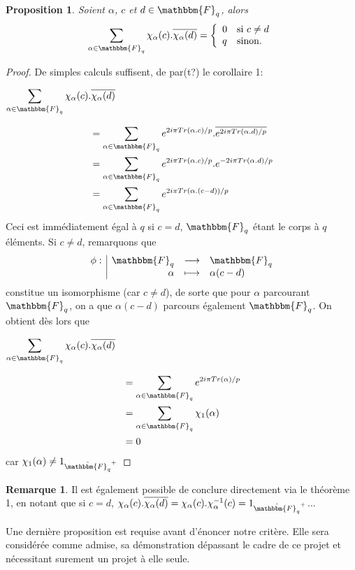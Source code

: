 \documentclass[12pt]{article}
\newcommand{\Fq}{\mathbbm{F}_q}
\newcommand{\fonction}[5]{
\begin{displaymath}
\begin{array}{l|rcl}
\displaystyle
#1 : & #2 & \longrightarrow & #3 \\
    & #4 & \longmapsto & #5
\end{array}
\end{displaymath}
}
\newtheorem{prop}{Proposition}
\theoremstyle{definition}\newtheorem{defn}{Définition}
\theoremstyle{definition}\newtheorem{exm}{Exemple}
\theoremstyle{definition}\newtheorem{rem}{Remarque}
\theoremstyle{definition}\newtheorem{algo}{Algorithme}
\theoremstyle{remark}\newtheorem{exo}{Exercice}
\theoremstyle{remark}\newtheorem{note}{Note}
\theoremstyle{remark}\newtheorem{nota}{Notation}
\begin{document}
\begin{prop}
Soient $\alpha$, $c$ et $d \in \Fq$, alors
$$
\displaystyle\sum_{\alpha \in \Fq}\chi_\alpha(c).\overline{\chi_\alpha(d)} = \left\{
    \begin{array}{ll}
        0 & \mbox{si } c \ne d \\
        q & \mbox{sinon.}
    \end{array}
\right.
$$
\end{prop}

\begin{proof}
De simples calculs suffisent, de par(t?) le corollaire 1:
\begin{center}$\displaystyle\sum_{\alpha \in \Fq}\chi_\alpha(c).\overline{\chi_\alpha(d)}$\end{center}
\begin{align*} 
&= \displaystyle\sum_{\alpha \in \Fq} e^{2i\pi Tr(\alpha.c)/p}.\overline{e^{2i\pi Tr(\alpha.d)/p}} \\
&= \displaystyle\sum_{\alpha \in \Fq} e^{2i\pi Tr(\alpha.c)/p}.{e^{-2i\pi Tr(\alpha.d)/p}} \\
&= \displaystyle\sum_{\alpha \in \Fq} e^{2i\pi Tr(\alpha.(c-d))/p}
\end{align*} 
Ceci est immédiatement égal à $q$ si $c=d$, $\Fq$ étant le corps à $q$ éléments. Si $c\ne d$, remarquons que \fonction{\phi}{\Fq}{\Fq}{\alpha}{\alpha(c-d)} constitue un isomorphisme (car $c\ne d$), de sorte que pour $\alpha$ parcourant $\Fq$, on a que $\alpha(c-d)$ parcours également $\Fq$. On obtient dès lors que 
\begin{center}$\displaystyle\sum_{\alpha \in \Fq}\chi_\alpha(c).\overline{\chi_\alpha(d)}$\end{center}
\begin{align*} 
&= \displaystyle\sum_{\alpha \in \Fq} e^{2i\pi Tr(\alpha)/p} \\
&= \displaystyle\sum_{\alpha \in \Fq} \chi_1(\alpha) \\
&= 0
\end{align*}
car $\chi_1(\alpha) \ne 1_{\hat{\Fq}^+}$
\end{proof}

\begin{rem}
Il est également possible de conclure directement via le théorème 1, en notant que si $c=d$, $\chi_\alpha(c).\overline{\chi_\alpha(d)} = \chi_\alpha(c).\chi_\alpha^{-1}(c) = 1_{\hat{\Fq}^+}$...
\end{rem}

Une dernière proposition est requise avant d'énoncer notre critère. Elle sera considérée comme admise, sa démonstration dépassant le cadre de ce projet et nécessitant surement un projet à elle seule.
\end{document}

